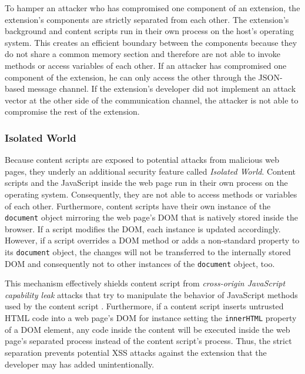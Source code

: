 	To hamper an attacker who has compromised one component of an extension, the extension's components are strictly separated from each other. The extension's background and content scripts run in their own process on the host's operating system. This creates an efficient boundary between the components because they do not share a common memory section and therefore are not able to invoke methods or access variables of each other. If an attacker has compromised one component of the extension, he can only access the other through the JSON-based message channel. If the extension's developer did not implement an attack vector at the other side of the communication channel, the attacker is not able to compromise the rest of the extension. 
	
\subsubsection{Isolated World}
	
	Because content scripts are exposed to potential attacks from malicious web pages, they underly an additional security feature called \textit{Isolated World}. Content scripts and the JavaScript inside the web page run in their own process on the operating system. Consequently, they are not able to access methods or variables of each other. Furthermore, content scripts have their own instance of the \texttt{document} object mirroring the web page's DOM that is natively stored inside the browser. If a script modifies the DOM, each instance is updated accordingly. However, if a script overrides a DOM method or adds a non-standard property to its \texttt{document} object, the changes will not be transferred to the internally stored DOM and consequently not to other instances of the \texttt{document} object, too.	
	
	This mechanism effectively shields content script from \textit{cross-origin JavaScript capability leak} attacks that try to manipulate the behavior of JavaScript methods used by the content script \cite{Carlini:2012:EGC:2362793.2362800, Barth:2009:CJC:1855768.1855780}. Furthermore, if a content script inserts untrusted HTML code into a web page's DOM for instance setting the \texttt{innerHTML} property of a DOM element, any code inside the content will be executed inside the web page's separated process instead of the content script's process. Thus, the strict separation prevents potential XSS attacks against the extension that the developer may has added unintentionally.

